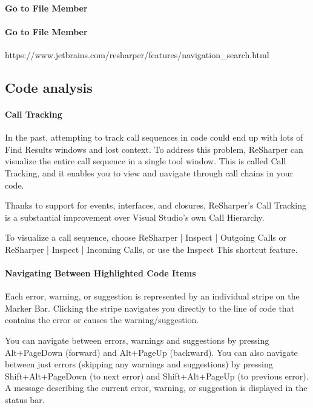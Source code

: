 \documentclass{book}
\begin{document}
\paragraph{Go to File Member}


\paragraph{Go to File Member}


https://www.jetbrains.com/resharper/features/navigation\_search.html


\subsection{Code analysis}

\paragraph{Call Tracking}In the past, attempting to track call sequences in code could end up with lots of Find Results windows and lost context. 
To address this problem, ReSharper can visualize the entire call sequence in a single tool window. This is called Call Tracking, 
and it enables you to view and navigate through call chains in your code.

Thanks to support for events, interfaces, and closures, 
ReSharper's Call Tracking is a substantial improvement over Visual Studio's own Call Hierarchy.

To visualize a call sequence, choose ReSharper | Inspect | Outgoing Calls or ReSharper | Inspect | Incoming Calls, 
or use the Inspect This shortcut feature.

\paragraph{Navigating Between Highlighted Code Items}Each error, warning, 
or suggestion is represented by an individual stripe on the Marker Bar. 
Clicking the stripe navigates you directly to the line of code that contains the error or causes the warning/suggestion.

You can navigate between errors, warnings and suggestions by pressing Alt+PageDown (forward) and Alt+PageUp (backward). 
You can also navigate between just errors (skipping any warnings and suggestions) by pressing Shift+Alt+PageDown (to next error) and Shift+Alt+PageUp (to previous error). 
A message describing the current error, warning, or suggestion is displayed in the status bar.
\end{document}
